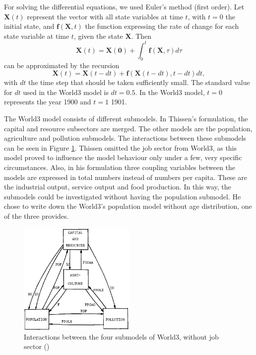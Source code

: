 \documentclass[10pt,a4paper]{scrartcl}
\begin{document}
For solving the differential equations, we used Euler's method (first order). Let $\mathbf{X}(t)$ represent the vector with all state variables at time $t$, with $t=0$ the initial state, and $\mathbf{f}(\mathbf{X}, t)$ the function expressing the rate of change for each state variable at time $t$, given the state $\mathbf{X}$. Then
\begin{equation}
\mathbf{X}(t) = \mathbf{X(0)} + \int_0^t \mathbf{f}(\mathbf{X}, \tau) d\tau
\end{equation}
can be approximated by the recursion
\begin{equation}
\mathbf{X}(t) = \mathbf{X}(t-dt) + \mathbf{f}(\mathbf{X}(t-dt), t-dt) dt,
\end{equation}
with $dt$ the time step that should be taken sufficiently small. The standard value for $dt$ used in the World3 model is $dt=0.5$. In the World3 model, $t=0$ represents the year 1900 and $t=1$ 1901.

The World3 model consists of different submodels. In Thissen's formulation, the capital and resource subsectors are merged. The other models are the population, agriculture and pollution submodels. The interactions between these submodels can be seen in Figure \ref{interactions}. Thissen omitted the job sector from World3, as this model proved to influence the model behaviour only under a few, very specific circumstances. Also, in his formulation three coupling variables between the models are expressed in total numbers instead of numbers per capita. These are the industrial output, service output and food production. In this way, the submodels could be investigated without having the population submodel. He chose to write down the World3's population model without age distribution, one of the three \cite{meadows1974dynamics} provides.

\begin{figure}
\centering
\includegraphics[width=0.5\textwidth]{./plaatjes/submodel-interactions.png}
\caption{Interactions between the four submodels
of World3, without job sector (\cite{thissen1978investigations})}
\label{interactions}
\end{figure}
\end{document}

